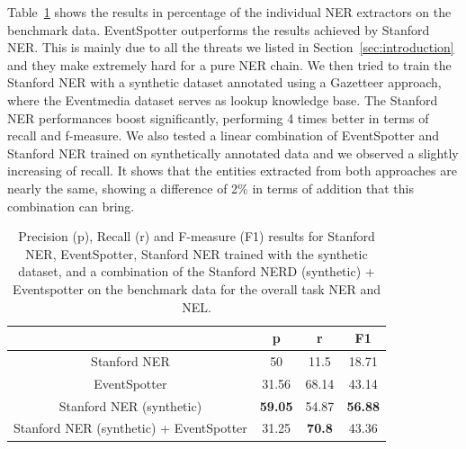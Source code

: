 \documentclass[10pt,a4paper]{article}
\begin{document}
Table~\ref{tab:manual} shows the results in percentage of the individual NER extractors on the benchmark data. EventSpotter outperforms the results achieved by Stanford NER. This is mainly due to all the threats we listed in Section~\ref{sec:introduction} and they make extremely hard for a pure NER chain. We then tried to train the Stanford NER with a synthetic dataset annotated using a Gazetteer approach, where the Eventmedia dataset serves as lookup knowledge base. The Stanford NER performances boost significantly, performing 4 times better in terms of recall and f-measure. We also tested a linear combination of EventSpotter and Stanford NER trained on synthetically annotated data and we observed a slightly increasing of recall. It shows that the entities extracted from both approaches are nearly the same, showing a difference of 2\% in terms of addition that this combination can bring.

\begin{table}[h]
\centering %
\begin{tabular}{c c c c} %
\hline %
& p & r & F1 \\ [0.5ex] %
\hline\hline %
Stanford NER & 50 & 11.5 & 18.71 \\
EventSpotter & 31.56 & 68.14 & 43.14 \\
Stanford NER (synthetic) & \textbf{59.05} & 54.87 & \textbf{56.88} \\
Stanford NER (synthetic) + EventSpotter & 31.25 & \textbf{70.8} & 43.36 \\
\hline %
\end{tabular}
\caption{Precision (p), Recall (r) and F-measure (F1) results for Stanford NER, EventSpotter, Stanford NER trained with the synthetic dataset, and a combination of the Stanford NERD (synthetic) + Eventspotter on the benchmark data for the overall task NER and NEL.} %
\label{tab:manual} %
\end{table}
\end{document}
